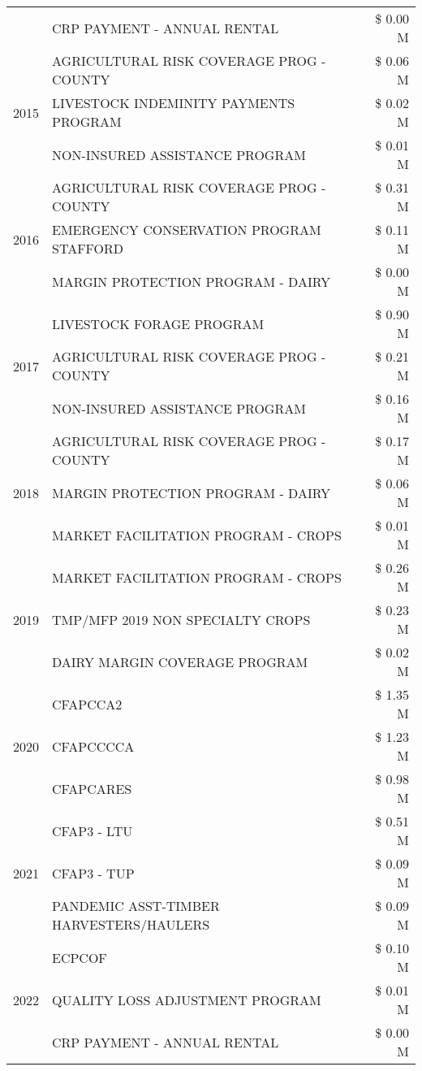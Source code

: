 \begin{tabular}{llr}
 & CRP PAYMENT - ANNUAL RENTAL & \$ 0.00 M \\
\cline{1-3}
\multirow[t]{3}{*}{2015} & AGRICULTURAL RISK COVERAGE PROG - COUNTY & \$ 0.06 M \\
 & LIVESTOCK INDEMINITY PAYMENTS PROGRAM & \$ 0.02 M \\
 & NON-INSURED ASSISTANCE PROGRAM & \$ 0.01 M \\
\cline{1-3}
\multirow[t]{3}{*}{2016} & AGRICULTURAL RISK COVERAGE PROG - COUNTY & \$ 0.31 M \\
 & EMERGENCY CONSERVATION PROGRAM STAFFORD & \$ 0.11 M \\
 & MARGIN PROTECTION PROGRAM - DAIRY & \$ 0.00 M \\
\cline{1-3}
\multirow[t]{3}{*}{2017} & LIVESTOCK FORAGE PROGRAM & \$ 0.90 M \\
 & AGRICULTURAL RISK COVERAGE PROG - COUNTY & \$ 0.21 M \\
 & NON-INSURED ASSISTANCE PROGRAM & \$ 0.16 M \\
\cline{1-3}
\multirow[t]{3}{*}{2018} & AGRICULTURAL RISK COVERAGE PROG - COUNTY & \$ 0.17 M \\
 & MARGIN PROTECTION PROGRAM - DAIRY & \$ 0.06 M \\
 & MARKET FACILITATION PROGRAM - CROPS & \$ 0.01 M \\
\cline{1-3}
\multirow[t]{3}{*}{2019} & MARKET FACILITATION PROGRAM - CROPS & \$ 0.26 M \\
 & TMP/MFP 2019 NON SPECIALTY CROPS & \$ 0.23 M \\
 & DAIRY MARGIN COVERAGE PROGRAM & \$ 0.02 M \\
\cline{1-3}
\multirow[t]{3}{*}{2020} & CFAPCCA2 & \$ 1.35 M \\
 & CFAPCCCCA & \$ 1.23 M \\
 & CFAPCARES & \$ 0.98 M \\
\cline{1-3}
\multirow[t]{3}{*}{2021} & CFAP3 - LTU & \$ 0.51 M \\
 & CFAP3 - TUP & \$ 0.09 M \\
 & PANDEMIC ASST-TIMBER HARVESTERS/HAULERS & \$ 0.09 M \\
\cline{1-3}
\multirow[t]{3}{*}{2022} & ECPCOF & \$ 0.10 M \\
 & QUALITY LOSS ADJUSTMENT PROGRAM & \$ 0.01 M \\
 & CRP PAYMENT - ANNUAL RENTAL & \$ 0.00 M \\
\cline{1-3}
\bottomrule
\end{tabular}
